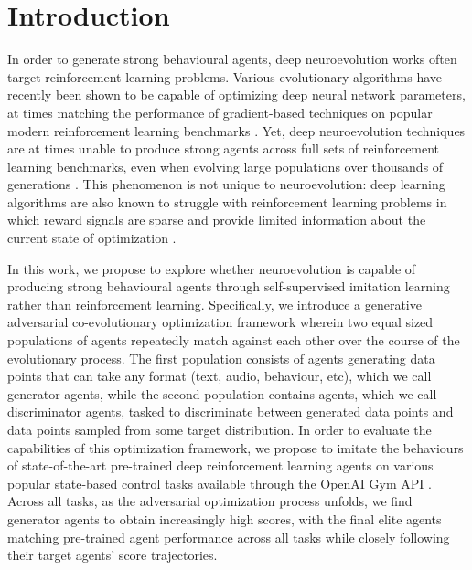 \documentclass[dvipsnames,format=sigconf,anonymous=false,review=false]{acmart}
\begin{document}
\maketitle


\section{Introduction}

In order to generate strong behavioural agents, deep neuroevolution works often target reinforcement learning problems. Various evolutionary algorithms have recently been shown to be capable of optimizing deep neural network parameters, at times matching the performance of gradient-based techniques on popular modern reinforcement learning benchmarks \cite{salimans2017evolution,such2017deep,risi2019deep, leclei2022neuroevolution}. Yet, deep neuroevolution techniques are at times unable to produce strong agents across full sets of reinforcement learning benchmarks, even when evolving large populations over thousands of generations \cite{salimans2017evolution,such2017deep, leclei2022neuroevolution}. This phenomenon is not unique to neuroevolution: deep learning algorithms are also known to struggle with reinforcement learning problems in which reward signals are sparse and provide limited information about the current state of optimization \cite{lecun2016predictive}. 

In this work, we propose to explore whether neuroevolution is capable of producing strong behavioural agents through self-supervised imitation learning rather than reinforcement learning. Specifically, we introduce a generative adversarial co-evolutionary optimization framework wherein two equal sized populations of agents repeatedly match against each other over the course of the evolutionary process. The first population consists of agents generating data points that can take any format (text, audio, behaviour, etc), which we call generator agents, while the second population contains agents, which we call discriminator agents, tasked to discriminate between generated data points and data points sampled from some target distribution. In order to evaluate the capabilities of this optimization framework, we propose to imitate the behaviours of state-of-the-art pre-trained deep reinforcement learning agents on various popular state-based control tasks available through the OpenAI Gym API \cite{brockman2016openai}. Across all tasks, as the adversarial optimization process unfolds, we find generator agents to obtain increasingly high scores, with the final elite agents matching pre-trained agent performance across all tasks while closely following their target agents’ score trajectories.
\end{document}
